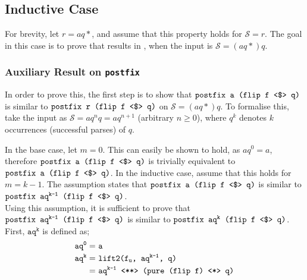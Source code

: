 \subsection{Inductive Case}
For brevity, let $r = aq*$, and assume that this property holds for $\mathcal{S} = r$.
The goal in this case is to prove that  results in , when the input is $\mathcal{S} = (aq*)q$.

\subsubsection*{Auxiliary Result on \texttt{postfix}}

In order to prove this, the first step is to show that $\texttt{postfix a (flip f \fmap q)}$ is similar to $\texttt{postfix r (flip f \fmap q)}$ on $\mathcal{S} = (aq*)q$.
To formalise this, take the input as $\mathcal{S} = aq^nq = aq^{n + 1}$ (arbitrary $n \geq 0$), where $q^k$ denotes $k$ occurrences (successful parses) of $q$.

In the base case, let $m = 0$.
This can easily be shown to hold, as $aq^0 = a$, therefore $\texttt{postfix a (flip f \fmap q)}$ is trivially equivalent to $\texttt{postfix a (flip f \fmap q)}$.
In the inductive case, assume that this holds for $m = k - 1$.
The assumption states that $\texttt{postfix a (flip f \fmap q)}$ is similar to $\texttt{postfix aq}^\texttt{k-1}\texttt{ (flip f \fmap q)}$. \\
Using this assumption, it is sufficient to prove that $\texttt{postfix aq}^\texttt{k-1}\texttt{ (flip f \fmap q)}$ is similar to $\texttt{postfix aq}^\texttt{k}\texttt{ (flip f \fmap q)}$.
First, $\texttt{aq}^\texttt{k}$ is defined as;
\begin{align*}
    \texttt{aq}^\texttt{0} =\ & \texttt{a} \\
    \texttt{aq}^\texttt{k} =\ & \texttt{lift2(f}_\texttt{u}\texttt{, aq}^\texttt{k-1}\texttt{, q)} \\
    =\ & \texttt{aq}^\texttt{k-1}\texttt{ \pa (pure (flip f) \ap q)}
\end{align*}

